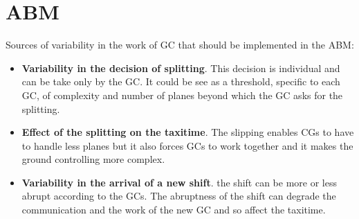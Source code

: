 \documentclass{article}
\begin{document}
\section{ABM}
Sources of variability in the work of GC that should be implemented in the ABM:
\begin{itemize}
	\item \textbf{Variability in the decision of splitting}. This decision is individual and can be take only by the GC. It could be see as a threshold, specific to each GC, of complexity and number of planes beyond which the GC asks for the splitting.
	\item \textbf{Effect of the splitting on the taxitime}. The slipping enables CGs to have to handle less planes but it also forces GCs to work together and it makes the ground controlling more complex.
	\item \textbf{Variability in the arrival of a new shift}. the shift can be more or less abrupt according to the GCs. The abruptness of the shift can degrade the communication and the work of the new GC and so affect the taxitime.
\end{itemize}
\end{document}
